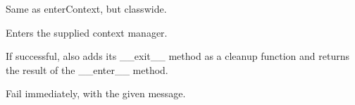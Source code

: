 \documentclass[letterpaper,10pt,english]{sphinxmanual}
\begin{document}
\begin{fulllineitems}
\begin{fulllineitems}
\end{fulllineitems}


\begin{fulllineitems}
\label{\detokenize{_autosummary/tests.test_unit.test_sqlite:tests.test_unit.test_sqlite.enterClassContext}}
\pysigstartsignatures
{}
\pysigstopsignatures
\sphinxAtStartPar
Same as enterContext, but class\sphinxhyphen{}wide.

\end{fulllineitems}


\begin{fulllineitems}
\label{\detokenize{_autosummary/tests.test_unit.test_sqlite:tests.test_unit.test_sqlite.enterContext}}
\pysigstartsignatures
{}
\pysigstopsignatures
\sphinxAtStartPar
Enters the supplied context manager.

\sphinxAtStartPar
If successful, also adds its \_\_exit\_\_ method as a cleanup
function and returns the result of the \_\_enter\_\_ method.

\end{fulllineitems}


\begin{fulllineitems}
\label{\detokenize{_autosummary/tests.test_unit.test_sqlite:tests.test_unit.test_sqlite.fail}}
\pysigstartsignatures
{}
\pysigstopsignatures
\sphinxAtStartPar
Fail immediately, with the given message.

\end{fulllineitems}



\end{fulllineitems}
\end{document}
